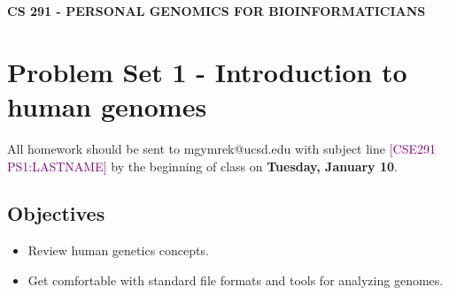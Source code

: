 \documentclass[12pt]{article}
\begin{document}
\textbf{CS 291 - PERSONAL GENOMICS FOR BIOINFORMATICIANS}

\section*{Problem Set 1 - Introduction to human genomes}

All homework should be sent to mgymrek@ucsd.edu with subject line \textcolor{purple}{[CSE291 PS1:LASTNAME]} by the beginning of class on \textbf{Tuesday, January 10}. %

\subsection*{Objectives}
\begin{itemize}
\item Review human genetics concepts.
\item Get comfortable with standard file formats and tools for analyzing genomes.
\end{itemize}
\end{document}
